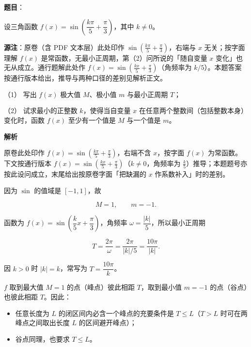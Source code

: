 \begin{answer}

\textbf{题目}：

设三角函数 $f(x)=\sin\left(\dfrac{k\pi}{5}+\dfrac{\pi}{3}\right)$，其中 $k\neq0$。

\begin{gktip}
\textbf{源注}：原卷（含 PDF 文本层）此处印作 $\sin\left(\frac{k\pi}{5}+\frac{\pi}{3}\right)$，右端与 $x$ 无关；按字面理解 $f(x)$ 是常函数，无最小正周期，第（2）问所说的「随自变量 $x$ 变化」也无从成立。通行题解此处作 $f(x)=\sin\left(\frac{kx}{5}+\frac{\pi}{3}\right)$（角频率为 $k/5$）。本题答案按通行版本给出，推导与两种口径的差别见解析正文。
\end{gktip}

（1） 写出 $f(x)$ 极大值 $M$、极小值 $m$ 与最小正周期 $T$；

（2） 试求最小的正整数 $k$，使得当自变量 $x$ 在任意两个整数间（包括整数本身）变化时，函数 $f(x)$ 至少有一个值是 $M$ 与一个值是 $m$。

\textbf{解析}

\begin{gktip}
原卷此处印作 $f(x)=\sin\left(\frac{k\pi}{5}+\frac{\pi}{3}\right)$，右端不含 $x$，按字面 $f(x)$ 为常函数。下文按通行版本 $f(x)=\sin\left(\frac{kx}{5}+\frac{\pi}{3}\right)$（$k\neq0$，角频率为 $\frac{k}{5}$）推导；本题题号亦按此设问成立，末尾给出按原卷字面「把缺漏的 $x$ 作系数补入」时的差别。
\end{gktip}


因为 $\sin$ 的值域是 $[-1,1]$，故

\nopagebreak[4]
\[
M=1,\qquad m=-1.
\]

函数为 $f(x)=\sin\left(\dfrac{k}{5}x+\dfrac{\pi}{3}\right)$，角频率 $\omega=\dfrac{|k|}{5}$，所以最小正周期

\nopagebreak[4]
\[
T=\frac{2\pi}{\omega}=\frac{2\pi}{|k|/5}=\frac{10\pi}{|k|}.
\]

因 $k>0$ 时 $|k|=k$，常写为 $T=\dfrac{10\pi}{k}$。


$f$ 取到最大值 $M=1$ 的点（峰点）彼此相距 $T$，取到最小值 $m=-1$ 的点（谷点）也彼此相距 $T$。因此：

\begin{itemize}
\item 任意长度为 $L$ 的闭区间内必含一个峰点的充要条件是 $T\leqslant L$（$T>L$ 时可在两峰点之间取出长度 $L$ 的区间避开峰点）；
\item 谷点同理，也要求 $T\leqslant L$。
\end{itemize}


\end{answer}
